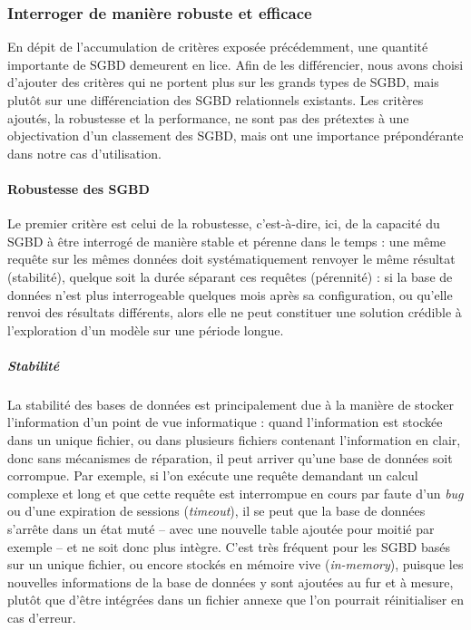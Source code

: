 		\subsubsection{Interroger de manière robuste et efficace}
		
		En dépit de l'accumulation de critères exposée précédemment, une quantité importante de SGBD demeurent en lice.
		Afin de les différencier, nous avons choisi d'ajouter des critères qui ne portent plus sur les grands types de SGBD, mais plutôt sur une différenciation des SGBD relationnels existants.
		Les critères ajoutés, la robustesse et la performance, ne sont pas des \og prétextes \fg{} à une objectivation d'un classement des SGBD, mais ont une importance prépondérante dans notre cas d'utilisation.
		
			\paragraph*{Robustesse des SGBD}
		Le premier critère est celui de la robustesse, c'est-à-dire, ici, de la capacité du SGBD à être interrogé de manière stable et pérenne dans le temps : une même requête sur les mêmes données doit systématiquement renvoyer le même résultat (stabilité), quelque soit la durée séparant ces requêtes (pérennité) : si la base de données n'est plus interrogeable quelques mois après sa configuration, ou qu'elle renvoi des résultats différents, alors elle ne peut constituer une solution crédible à l'exploration d'un modèle sur une période longue.
		
		\subparagraph{Stabilité}
		La stabilité des bases de données est principalement due à la manière de stocker l'information d'un point de vue informatique : quand l'information est stockée dans un unique fichier, ou dans plusieurs fichiers contenant l'information \og en clair\fg{}, donc sans mécanismes de réparation, il peut arriver qu'une base de données soit \og corrompue\fg{}.
		Par exemple, si l'on exécute une requête demandant un calcul complexe et long et que cette requête est interrompue en cours par faute d'un \textit{bug} ou d'une expiration de sessions (\textit{timeout}), il se peut que la base de données s'arrête dans un état muté -- avec une nouvelle table ajoutée pour moitié par exemple -- et ne soit donc plus intègre.
		C'est très fréquent pour les SGBD basés sur un unique fichier, ou encore stockés en mémoire vive (\og \textit{in-memory}\fg{}), puisque les nouvelles informations de la base de données y sont ajoutées au fur et à mesure, plutôt que d'être intégrées dans un fichier annexe que l'on pourrait réinitialiser en cas d'erreur.
		
